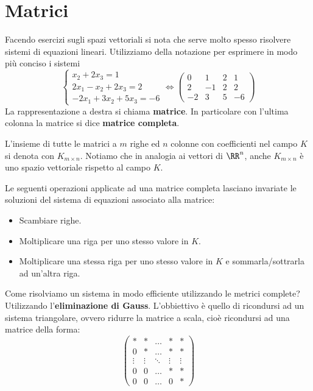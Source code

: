 \documentclass[11pt]{scrartcl}
\begin{document}
	\section{Matrici}
	Facendo esercizi sugli spazi vettoriali si nota che serve molto spesso risolvere sistemi di equazioni lineari. Utilizziamo della notazione per esprimere in modo più conciso i sistemi
	$$\begin{cases}
		x_2+2x_3=1 \\
		2x_1-x_2+2x_3=2 \\
		-2x_1+3x_2+5x_3=-6
	\end{cases}\iff
	\left(\begin{array}{ccc|c}
		0 & 1 & 2 & 1 \\
		2 & -1 & 2 & 2 \\
		-2 & 3 & 5 & -6
	\end{array}\right)$$
	La rappresentazione a destra si chiama \textbf{matrice}. In particolare con l'ultima colonna la matrice si dice \textbf{matrice completa}.
	\begin{definition}
		L'insieme di tutte le matrici a $m$ righe ed $n$ colonne con coefficienti nel campo $K$ si denota con $K_{m\times n}$. Notiamo che in analogia ai vettori di $\RR^n$, anche $K_{m\times n}$ è uno spazio vettoriale rispetto al campo $K$.  
	\end{definition}
	\begin{lemma}\label{matrix-rows}
		Le seguenti operazioni applicate ad una matrice completa lasciano invariate le soluzioni del sistema di equazioni associato alla matrice:
		\begin{itemize}
			\item Scambiare righe.
			\item Moltiplicare una riga per uno stesso valore in $K$.
			\item Moltiplicare una stessa riga per uno stesso valore in $K$ e sommarla/sottrarla ad un'altra riga.
		\end{itemize}
	\end{lemma}
	Come risolviamo un sistema in modo efficiente utilizzando le metrici complete? Utilizzando l'\textbf{eliminazione di Gauss}. L'obbiettivo è quello di ricondursi ad un sistema triangolare, ovvero ridurre la matrice a scala, cioè ricondursi ad una matrice della forma:
	$$\begin{pmatrix}
		* & * & \dots & * & * \\
		0 & * & \dots & * & * \\
		\vdots & \vdots & \ddots & \vdots & \vdots \\
		0 & 0 & \dots & * & * \\
		0 & 0 & \dots & 0 & *
 	\end{pmatrix}$$
\end{document}
